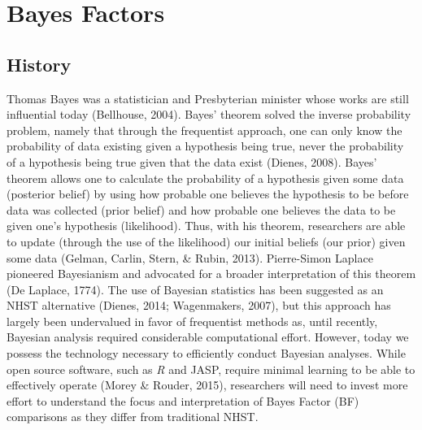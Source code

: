 \documentclass[,man, mask]{apa6}
\begin{document}
\hypertarget{bayes-factors}{%
\section{Bayes Factors}\label{bayes-factors}}

\hypertarget{history-1}{%
\subsection{History}\label{history-1}}

Thomas Bayes was a statistician and Presbyterian minister whose works are still influential today (Bellhouse, 2004). Bayes' theorem solved the inverse probability problem, namely that through the frequentist approach, one can only know the probability of data existing given a hypothesis being true, never the probability of a hypothesis being true given that the data exist (Dienes, 2008). Bayes' theorem allows one to calculate the probability of a hypothesis given some data (posterior belief) by using how probable one believes the hypothesis to be before data was collected (prior belief) and how probable one believes the data to be given one's hypothesis (likelihood). Thus, with his theorem, researchers are able to update (through the use of the likelihood) our initial beliefs (our prior) given some data (Gelman, Carlin, Stern, \& Rubin, 2013). Pierre-Simon Laplace pioneered Bayesianism and advocated for a broader interpretation of this theorem (De Laplace, 1774). The use of Bayesian statistics has been suggested as an NHST alternative (Dienes, 2014; Wagenmakers, 2007), but this approach has largely been undervalued in favor of frequentist methods as, until recently, Bayesian analysis required considerable computational effort. However, today we possess the technology necessary to efficiently conduct Bayesian analyses. While open source software, such as \emph{R} and JASP, require minimal learning to be able to effectively operate (Morey \& Rouder, 2015), researchers will need to invest more effort to understand the focus and interpretation of Bayes Factor (BF) comparisons as they differ from traditional NHST.
\end{document}
